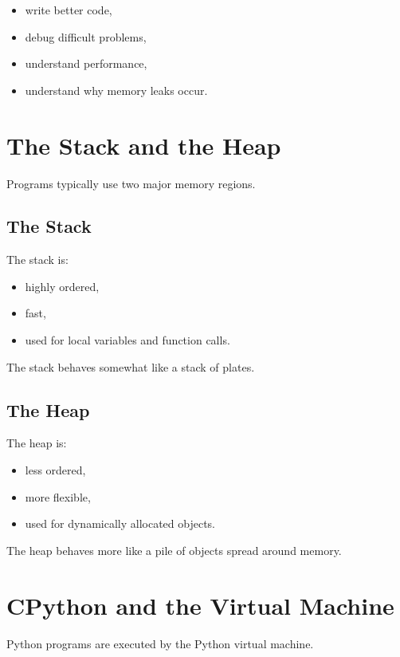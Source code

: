 \documentclass[11pt]{article}
\begin{document}
\begin{itemize}
    \item write better code,
    \item debug difficult problems,
    \item understand performance,
    \item understand why memory leaks occur.
\end{itemize}

\section{The Stack and the Heap}

Programs typically use two major memory regions.

\subsection{The Stack}

The stack is:

\begin{itemize}
    \item highly ordered,
    \item fast,
    \item used for local variables and function calls.
\end{itemize}

The stack behaves somewhat like a stack of plates.

\subsection{The Heap}

The heap is:

\begin{itemize}
    \item less ordered,
    \item more flexible,
    \item used for dynamically allocated objects.
\end{itemize}

The heap behaves more like a pile of objects spread around memory.

\section{CPython and the Virtual Machine}

Python programs are executed by the Python virtual machine.
\end{document}
